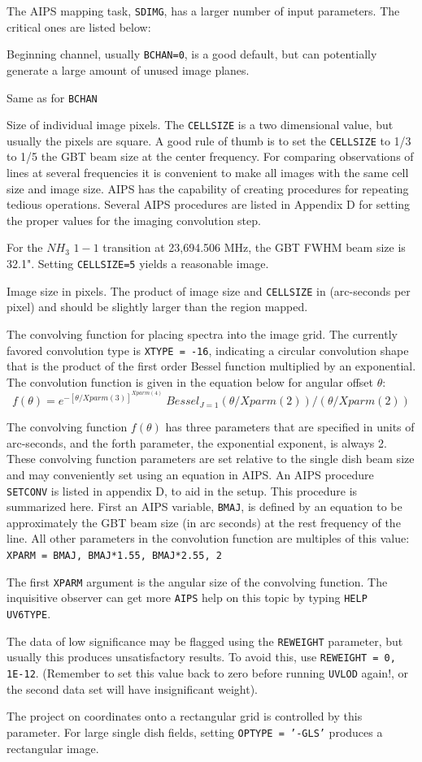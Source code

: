 \documentclass[12pt,twoside]{article}
\newcommand{\myitem}[1]{\item{\makebox[1.25in][l]{{\tt #1}}}}
\begin{document}
The AIPS mapping task, {\tt SDIMG}, has a larger number of input parameters.  The
critical ones are listed below:
\begin{description}
\myitem{BCHAN} Beginning channel,  usually {\tt BCHAN=0}, is a good default,
but can potentially generate a large amount of unused image planes.
\myitem{ECHAN} Same as for {\tt BCHAN}
\myitem{CELLSIZE}  Size of individual image pixels.   The {\tt CELLSIZE} is a two
dimensional value, but usually the pixels are square.   A good rule of thumb is to set
the {\tt CELLSIZE} to 1/3 to 1/5 the GBT beam size at the center frequency.
For comparing observations of lines at several frequencies it is convenient to 
make all images with the same cell size and image size.    AIPS has the
capability of creating procedures for repeating tedious operations.  
Several AIPS procedures are listed in Appendix D for setting the
proper values for the imaging convolution step.

For the $NH_3$ $1-1$ transition at 23,694.506 MHz, the GBT FWHM beam size is
32.1".   Setting {\tt CELLSIZE=5} yields a reasonable image.
\myitem{IMSIZE} Image size in pixels.  The product of image size and {\tt CELLSIZE} in 
(arc-seconds per pixel) and should be slightly larger than the region mapped.
\myitem{XTYPE} The convolving function for placing spectra into the image grid.
The currently favored convolution type is {\tt XTYPE = -16}, indicating a circular
convolution shape that is the product of the first order Bessel function multiplied by an exponential.   The convolution function is given in the equation below for angular 
offset $\theta$:
$$
f(\theta) = e^{- [\theta/Xparm(3)]^{Xparm(4)}} ~ Bessel_{J=1}( \theta/Xparm(2)) / (\theta/Xparm(2))
$$ 
\myitem{XPARM}  The convolving function $f(\theta)$ has three parameters that are specified
in units of arc-seconds, and the forth parameter, the exponential exponent, is
always 2.   These convolving function parameters are set relative to the single dish
beam size and may conveniently set using an equation in AIPS.   
An AIPS procedure {\tt SETCONV} is listed in appendix D, to aid in the setup.
This procedure is summarized here.  First an AIPS variable, {\tt BMAJ}, is defined
by an equation to be approximately the GBT beam size (in arc seconds) at the 
rest frequency of the line.
All other parameters in the convolution function are multiples of this value:
\\
{\tt XPARM =  BMAJ, BMAJ*1.55, BMAJ*2.55, 2} ~~~

The first {\tt XPARM} argument is the angular size of the convolving function.
The inquisitive observer can get more {\tt AIPS} help on this topic by typing {\tt HELP UV6TYPE}.
\myitem{REWEIGHT} The data of low significance may be flagged using the
{\tt REWEIGHT} parameter, but usually this produces unsatisfactory results.  To
avoid this, use {\tt REWEIGHT = 0, 1E-12}.   (Remember to set this value
back to zero before running {\tt UVLOD} again!, or the second data set will have
insignificant weight).
\myitem{OPTYPE} The project on coordinates onto a rectangular grid is controlled by
this parameter.  For large single dish fields,  setting {\tt OPTYPE = '-GLS'} produces
a rectangular image.
\end{description}
\end{document}
